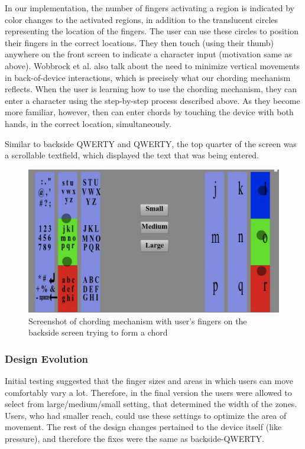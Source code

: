 In our implementation, the number of fingers activating a region is indicated by color changes to the activated regions, in addition to the translucent circles representing the location of the fingers. The user can use these circles to position their fingers in the correct locations. They then touch (using their thumb) anywhere on the front screen to indicate a character input (motivation same as above). Wobbrock et al. also talk about the need to minimize vertical movements in back-of-device interactions, which is precisely what our chording mechanism reflects. When the user is learning how to use the chording mechanism, they can enter a character using the step-by-step process described above.  As they become more familiar, however, then can enter chords by touching the device with both hands, in the correct location, simultaneously.

Similar to backside QWERTY and QWERTY, the top quarter of the screen was a scrollable textfield, which displayed the text that was being entered.

\begin{figure}
    \includegraphics[scale=0.45]{Figures/chording.pdf} 
    \caption{Screenshot of chording mechanism with user's fingers on
      the backside screen trying to form a chord}
\end{figure} 
\subsubsection{Design Evolution}

Initial testing suggested that the finger sizes and areas in which users can move comfortably vary a lot. Therefore, in the final version the users were allowed to select from large/medium/small setting, that determined the width of the zones. Users, who had smaller reach, could use these settings to optimize the area of movement. The rest of the design changes pertained to the device itself (like pressure), and therefore the fixes were the same as backside-QWERTY.
